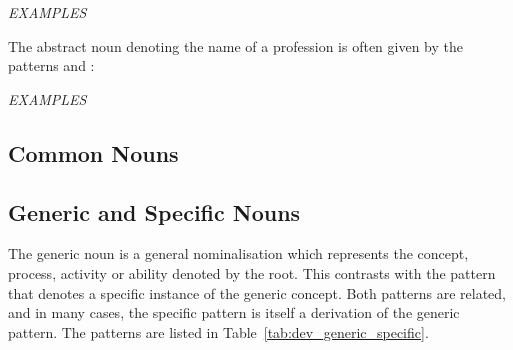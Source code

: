 \documentclass[grammar]{subfiles}
\begin{document}
  \begin{exe}
    \ex \emph{EXAMPLES}
  \end{exe}

  The abstract noun denoting the name of a profession is often given by the patterns  and :

  \begin{exe}
    \ex \emph{EXAMPLES}
  \end{exe}

  \subsection{Common Nouns}
  \label{ssec:dev_common_nouns}

  \ToBeWritten

  \subsection{Generic and Specific Nouns}
  \label{ssec:dev_generic_nouns}

  The generic noun is a general nominalisation which represents the concept, process, activity or ability denoted by the root. 
  This contrasts with the pattern that denotes a specific instance of the generic concept. 
  Both patterns are related, and in many cases, the specific pattern is itself a derivation of the generic pattern. 
  The patterns are listed in Table~\ref{tab:dev_generic_specific}.
\end{document}
